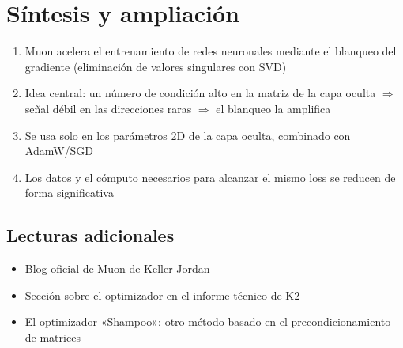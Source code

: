 \section{Síntesis y ampliación}

\begin{enumerate}
  \item Muon acelera el entrenamiento de redes neuronales mediante el blanqueo del gradiente (eliminación de valores singulares con SVD)
  \item Idea central: un número de condición alto en la matriz de la capa oculta $\Rightarrow$ señal débil en las direcciones raras $\Rightarrow$ el blanqueo la amplifica
  \item Se usa solo en los parámetros 2D de la capa oculta, combinado con AdamW/SGD
  \item Los datos y el cómputo necesarios para alcanzar el mismo loss se reducen de forma significativa
\end{enumerate}

\subsection{Lecturas adicionales}
\begin{itemize}
  \item Blog oficial de Muon de Keller Jordan
  \item Sección sobre el optimizador en el informe técnico de K2
  \item El optimizador «Shampoo»: otro método basado en el precondicionamiento de matrices
\end{itemize}


